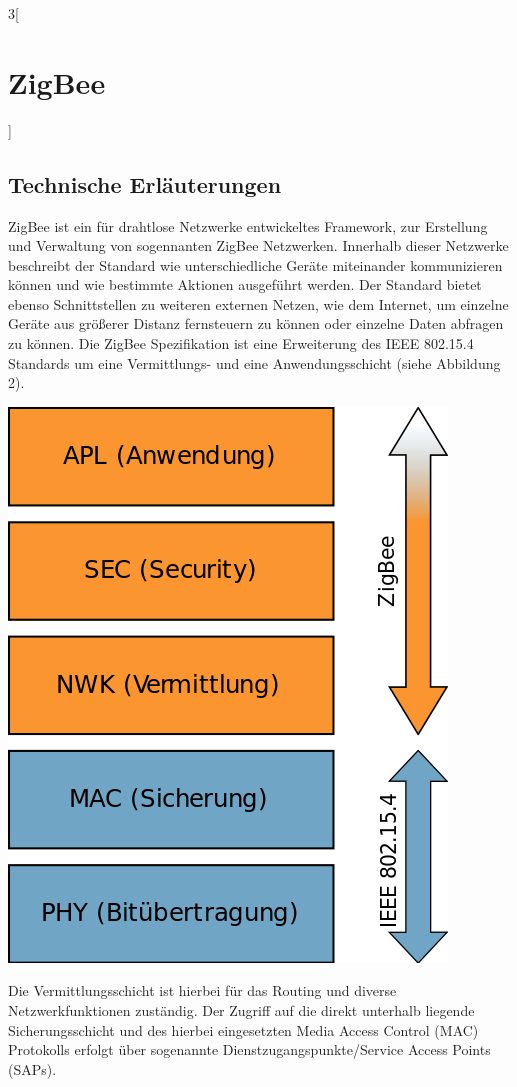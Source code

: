 \begin{multicols}{3}[\section{ZigBee}]
\subsection*{Technische Erläuterungen}
ZigBee ist ein für drahtlose Netzwerke entwickeltes Framework, zur Erstellung und Verwaltung von sogennanten ZigBee Netzwerken. Innerhalb dieser Netzwerke beschreibt der Standard wie unterschiedliche Geräte miteinander kommunizieren können und wie bestimmte Aktionen ausgeführt werden. Der Standard bietet ebenso Schnittstellen zu weiteren externen Netzen, wie dem Internet, um einzelne Geräte aus größerer Distanz fernsteuern zu können oder einzelne Daten abfragen zu können.
Die ZigBee Spezifikation ist eine Erweiterung des IEEE 802.15.4 Standards um eine Vermittlungs- und eine Anwendungsschicht (siehe Abbildung 2). 
\begin{Figure}
\includegraphics[width=\linewidth]{Kapitel/ZigBee/Grafiken/zigbee_stack.png}
\end{Figure}
Die Vermittlungsschicht ist hierbei für das Routing und diverse Netzwerkfunktionen zuständig. Der Zugriff auf die direkt unterhalb liegende Sicherungsschicht und des hierbei eingesetzten Media Access Control (MAC) Protokolls erfolgt über sogenannte Dienstzugangspunkte/Service Access Points (SAPs).

\end{multicols}
